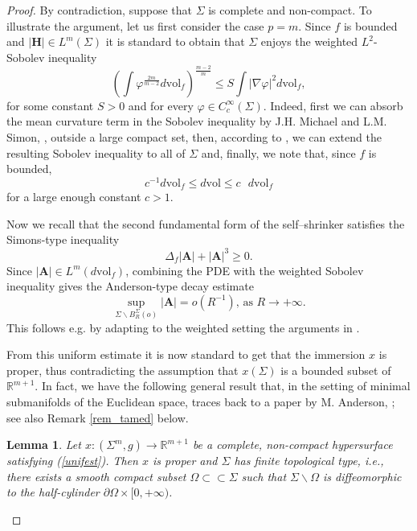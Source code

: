\documentclass[11pt,leqno]{amsart}\usepackage{amsmath}
\newtheorem{lemma}[theorem]{Lemma}
\numberwithin{equation}{section}
\begin{document}
\begin{proof}
By contradiction, suppose that $\Sigma$ is complete and non-compact. To illustrate the argument, let us first consider the case $p=m$. Since $f$ is bounded
and $\left\vert \mathbf{H}\right\vert \in L^{m}\left(  \Sigma\right)  $ it is standard to obtain
that $\Sigma$ enjoys the weighted $L^{2}$-Sobolev inequality\[
\left(  \int\varphi^{\frac{2m}{m-2}}d\mathrm{vol}_{f}\right)  ^{\frac{m-2}{m}}\leq
S\int\left\vert \nabla\varphi\right\vert ^{2}d\mathrm{vol}_{f},
\]
for some constant $S>0$ and for every $\varphi\in C_{c}^{\infty}\left(
\Sigma\right)  $. Indeed, first we can absorb the mean curvature term in the Sobolev inequality by J.H. Michael and L.M. Simon, \cite{MiSi-CPAM}, outside a large compact set, then,  according to \cite{Ca-Duke}, we can extend the resulting Sobolev inequality to all of $\Sigma$ and, finally, we note that, since $f$ is bounded,\[
c^{-1}d\mathrm{vol}_{f}\leq d\mathrm{vol}\leq c\text{ }d\mathrm{vol}_{f}\]
for a large enough constant $c>1$.

Now we recall that the second fundamental form of the self--shrinker satisfies
the Simons-type inequality\[
\Delta_{f}\left\vert \mathbf{A}\right\vert +\left\vert \mathbf{A}\right\vert
^{3}\geq0.
\]
Since $\left\vert \mathbf{A}\right\vert \in L^{m}\left(  d\mathrm{vol}_{f}\right)  $,
combining the PDE with the weighted Sobolev inequality gives the Anderson-type
decay estimate\begin{equation}
\sup_{\Sigma\backslash B_{R}^{\Sigma}\left(  o\right)  }\left\vert
\mathbf{A}\right\vert =o\left( R^{-1}\right)  \text{, as }R\rightarrow+\infty. \label{unifest}
\end{equation}
This follows e.g. by adapting to the weighted setting the arguments in
\cite{PiVe-DGA}.

From this uniform estimate it is now standard to get that the immersion $x$ is
proper, thus contradicting the assumption that $x\left(  \Sigma\right)  $ is a
bounded subset of $\mathbb{R}^{m+1}.$ In fact, we have the following general
result that, in the setting of minimal submanifolds of the Euclidean space,
traces back to a paper by M. Anderson, \cite{An-preprint}; see also Remark \ref{rem_tamed} below.

\begin{lemma}\label{lemma_finitetoptype}
Let $x\colon \left(  \Sigma^{m},g\right)  \rightarrow\mathbb{R}^{m+1}$ be a
complete, non-compact hypersurface satisfying (\ref{unifest}). Then $x$ is
proper and $\Sigma$ has finite topological type, i.e., there exists a smooth
compact subset $\Omega\subset\subset\Sigma$ such that $\Sigma\backslash\Omega$
is diffeomorphic to the half-cylinder $\partial\Omega\times\lbrack0,+\infty)$.
\end{lemma}


\end{proof}
\end{document}
